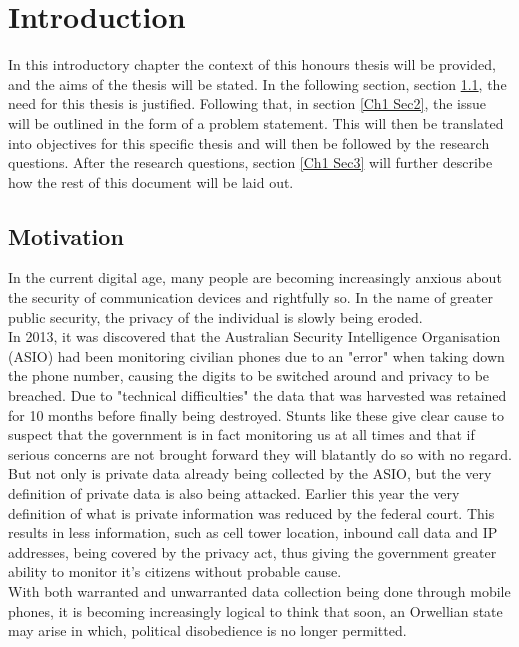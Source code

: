 
\chapter{Introduction} %

\label{Chapter 1} %

In this introductory chapter the context of this honours thesis will be provided, and the aims of the thesis will be stated.
In the following section, section \ref{Ch1 Sec1}, the need for this thesis is justified.
Following that, in section \ref{Ch1 Sec2}, the issue will be outlined in the form of a problem statement.
This will then be translated into objectives for this specific thesis and will then be followed by the research questions.
After the research questions, section \ref{Ch1 Sec3} will further describe how the rest of this document will be laid out.   


\section{Motivation}

\label{Ch1 Sec1}

In the current digital age, many people are becoming increasingly anxious about the security of communication devices and rightfully so.
In the name of greater public security, the privacy of the individual is slowly being eroded.\\

In 2013, it was discovered that the Australian Security Intelligence Organisation (ASIO) had been monitoring civilian phones due to an "error" when taking down the phone number, causing the digits to be switched around and privacy to be breached.
Due to "technical difficulties" the data that was harvested was retained for 10 months before finally being destroyed.\cite{Reference36}
Stunts like these give clear cause to suspect that the government is in fact monitoring us at all times and that if serious concerns are not brought forward they will blatantly do so with no regard.\\

But not only is private data already being collected by the ASIO, but the very definition of private data is also being attacked.
Earlier this year the very definition of what is private information was reduced by the federal court.
This results in less information, such as cell tower location, inbound call data and IP addresses, being covered by the privacy act, thus giving the government greater ability to monitor it's citizens without probable cause.\cite{Reference37}\\
With both warranted and unwarranted data collection being done through mobile phones, it is becoming increasingly logical to think that soon, an Orwellian state may arise in which, political disobedience is no longer permitted.

